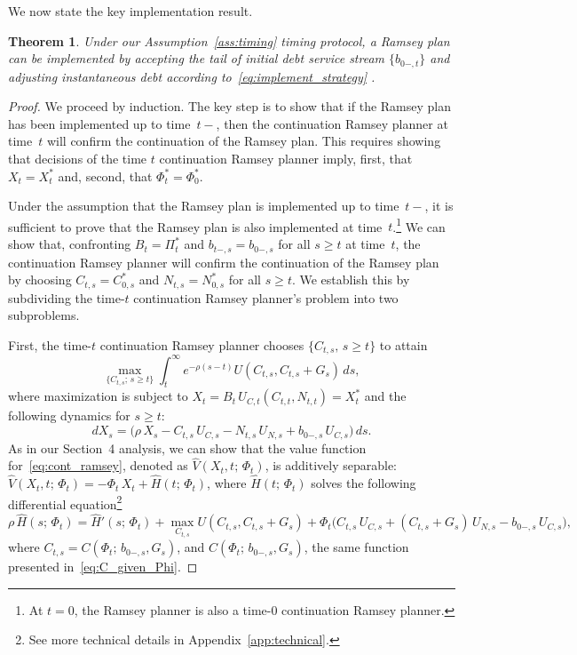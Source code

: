 \documentclass[12pt]{article}
\newtheorem{theorem}{Theorem}%
\begin{document}
{We now state the key implementation result.

\begin{theorem}\label{thm:implement}
	Under our Assumption~\ref{ass:timing} timing protocol, a Ramsey plan can be implemented by accepting the tail of  initial debt service stream  $\{b_{0-,t}\}$ and adjusting instantaneous debt according to~\eqref{eq:implement_strategy} .
\end{theorem}

\begin{proof}
	{We proceed by induction. The key step is to show that if the Ramsey plan has been implemented up to time~$t-$, then the continuation Ramsey planner at time~$t$ will confirm the continuation of the Ramsey plan. This requires showing that  decisions of the time $t$ continuation Ramsey planner imply, %
		first, that $X_t = X_t^*$ and, second, that $\Phi_t^* = \Phi_0^*$.}
	
	Under the assumption that the Ramsey plan is implemented up to time~$t-$, it is sufficient to prove that the Ramsey plan is also implemented at time~$t$.\footnote{At $t=0$, the Ramsey planner is also a time-0 continuation Ramsey planner.} We can show that,  confronting $B_t = \Pi_t^*$ and $b_{t-,s} = b_{0-,s}$ for all $s \ge t$ at time~$t$, the continuation Ramsey planner will confirm the continuation of the Ramsey plan by choosing $C_{t,s} = C_{0,s}^*$ and $N_{t,s} = N_{0,s}^*$ for all $s \ge t$. We establish this by subdividing the time-$t$ continuation Ramsey planner's problem into two subproblems.
	
	First, the time-$t$ continuation Ramsey planner chooses $\{C_{t,s},\, s \ge t\}$ to attain
	\begin{equation}\label{eq:cont_ramsey}
	\max_{\{C_{t,s};\, s \ge t\}} \int_t^\infty e^{-\rho(s-t)} U(C_{t,s}, C_{t,s}+G_s)\, ds,
	\end{equation}
	where maximization is subject to $X_t = B_t\, U_{C,t}(C_{t,t}, N_{t,t}) = X_t^*$ and the following dynamics for $s \ge t$:
	\begin{equation}\label{eq:dXs_cont}
	dX_s = \bigl(\rho\, X_s - C_{t,s}\, U_{C,s} - N_{t,s}\, U_{N,s} + b_{0-,s}\, U_{C,s}\bigr)\, ds.
	\end{equation}
	As in  our Section~4 analysis, we can show that the value function for~\eqref{eq:cont_ramsey}, denoted as $\widehat{V}(X_t, t;\, \Phi_t)$, is additively separable: $\widehat{V}(X_t, t;\, \Phi_t) = -\Phi_t\, X_t + \widehat{H}(t;\, \Phi_t)$, where $\widehat{H}(t;\, \Phi_t)$ solves the following differential equation\footnote{See more technical details in Appendix~\ref{app:technical}.}
	\begin{equation}\label{eq:Hhat_ode}
	\rho\, \widehat{H}(s;\, \Phi_t) = \widehat{H}'(s;\, \Phi_t) + \max_{C_{t,s}} U(C_{t,s}, C_{t,s}+G_s) + \Phi_t\bigl(C_{t,s}\, U_{C,s} + (C_{t,s}+G_s)\, U_{N,s} - b_{0-,s}\, U_{C,s}\bigr),
	\end{equation}
	where $C_{t,s} = C(\Phi_t;\, b_{0-,s}, G_s)$, and $C(\Phi_t;\, b_{0-,s}, G_s)$, the same function presented %
	in~\eqref{eq:C_given_Phi}. 
	

\end{proof}}
\end{document}
